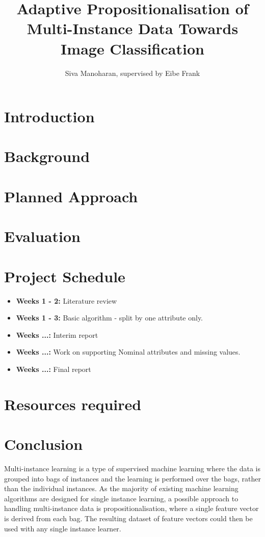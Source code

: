 \documentclass[a4paper,12pt,titlepage]{article} %
\title{Adaptive Propositionalisation of Multi-Instance Data Towards Image Classification}
\author{Siva Manoharan, supervised by Eibe Frank}
\begin{document}
\maketitle 

\section{Introduction}
\section{Background}
\section{Planned Approach}
\section{Evaluation}

\section{Project Schedule}
\begin{itemize}
	\item {\bf Weeks 1 - 2:} Literature review
	\item {\bf Weeks 1 - 3:} Basic algorithm - split by one attribute only.
	\item {\bf Weeks ...:} Interim report
	\item {\bf Weeks ...:} Work on supporting Nominal attributes and missing values.
	\item {\bf Weeks ...:} Final report
\end{itemize}
\section{Resources required}
\section{Conclusion}


Multi-instance learning is a type of supervised machine learning where the data is grouped into bags of instances and the learning is performed over the bags, rather than the individual instances. As the majority of existing machine learning algorithms are designed for single instance learning, a possible approach to handling multi-instance data is propositionalisation, where a single feature vector is derived from each bag. The resulting dataset of feature vectors could then be used with any single instance learner.
\end{document}
